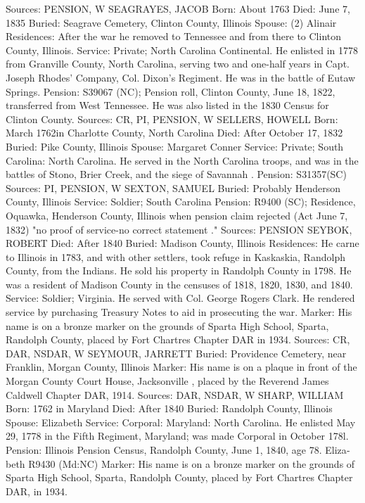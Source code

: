 Sources: PENSION, W 
SEAGRAYES, JACOB
Born: About 1763 
Died: June 7, 1835
Buried: Seagrave Cemetery, Clinton County, Illinois 
Spouse: (2) Alinair 
Residences: After the war he removed to Tennessee and from there to Clinton County, Illinois. 
Service: Private; North Carolina Continental. He enlisted in 1778 from Granville County, North Carolina, serving two and one-half years in Capt. Joseph Rhodes' Company, Col. Dixon's Regiment. He was in the battle of Eutaw Springs. 
Pension: S39067 (NC); Pension roll, Clinton County, June 18, 1822, transferred from West Tennessee. He was also listed in the 1830 Census for Clinton County. 
Sources: CR, PI, PENSION, W 
SELLERS, HOWELL 
Born: March 1762in Charlotte County, North Carolina 
Died: After October 17, 1832 
Buried: Pike County, Illinois 
Spouse: Margaret Conner 
Service: Private; South Carolina: North Carolina. He served in the North Carolina troops, and was in the battles of Stono, Brier Creek, and the siege of Savan­nah . 
Pension: S31357(SC) 
Sources: PI, PENSION, W 
SEXTON, SAMUEL 
Buried: Probably Henderson County, Illinois 
Service: Soldier; South Carolina
Pension: R9400 (SC); Residence, Oquawka, Henderson County, Illinois when pension claim rejected (Act June 7, 1832) "no proof of service-no correct statement ." 
Sources: PENSION 
SEYBOK, ROBERT 
Died: After 1840
Buried:  Madison County, Illinois Residences: He carne to Illinois in 1783, and with other settlers, took refuge in Kaskaskia, Randolph County, from the Indians. He sold his property in Randolph County in 1798. He was a resident of Madison County in the censuses of 1818, 1820, 1830, and 1840.
Service: Soldier; Virginia. He served with Col. George Rogers Clark. He rendered service by purchasing Treasury Notes to aid in prosecuting the war. 
Marker: His name is on a bronze marker on the grounds of Sparta High School, Sparta, Randolph County, placed by Fort Chartres Chapter DAR in 1934. 
Sources: CR, DAR, NSDAR, W 
SEYMOUR, JARRETT
Buried:  Providence Cemetery, near Franklin, Morgan County, Illinois
Marker:  His name is on a plaque in front of the Morgan County Court House, Jacksonville , placed by the Reverend James Caldwell Chapter DAR, 1914. 
Sources: DAR, NSDAR, W 
SHARP, WILLIAM
Born:  1762 in Maryland
Died:   After 1840
Buried:  Randolph County, Illinois
Spouse:  Elizabeth
Service:  Corporal: Maryland: North Carolina. He enlisted May 29, 1778 in the 
Fifth Regiment, Maryland; was made Corporal in October 178l.
Pension: Illinois Pension Census, Randolph County, June 1, 1840, age 78. Eliza­beth R9430 (Md:NC)
Marker:  His name is on a bronze marker on the grounds of Sparta High School, Sparta, Randolph County, placed by Fort Chartres Chapter DAR, in 1934.
